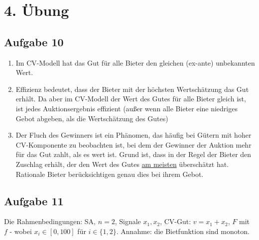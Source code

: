 \documentclass[12pt]{extreport} %
\theoremstyle{named}
\theoremstyle{itshape}
\theoremstyle{normal}
\begin{document}
\section*{4. Übung}

\subsection*{Aufgabe 10}

\begin{enumerate}[label=\alph*\upshape)]
	\item Im CV-Modell hat das Gut für alle Bieter den gleichen (ex-ante) unbekannten Wert.
	\item Effizienz bedeutet, dass der Bieter mit der höchsten Wertschätzung das Gut erhält. Da aber im CV-Modell der Wert des Gutes für alle Bieter gleich ist, ist jedes Auktionsergebnis effizient (außer wenn alle Bieter eine niedriges Gebot abgeben, als die Wertschätzung des Gutes)
	\item Der Fluch des Gewinners ist ein Phänomen, das häufig bei Gütern mit hoher CV-Komponente zu beobachten ist, bei dem der Gewinner der Auktion mehr für das Gut zahlt, als es wert ist. Grund ist, dass in der Regel der Bieter den Zuschlag erhält, der den Wert des Gutes \underline{am meisten} überschätzt hat. ~\\
		Rationale Bieter berücksichtigen genau dies bei ihrem Gebot.
\end{enumerate}

\subsection*{Aufgabe 11}

Die Rahmenbedingungen: SA, $n = 2$, Signale $x_1, x_2$, CV-Gut: $v = x_1 + x_2$, $F$ mit $f$ - wobei $x_{i} \in [0, 100]$ für $i \in \{1, 2 \}$. Annahme: die Bietfunktion sind monoton.
\end{document}
